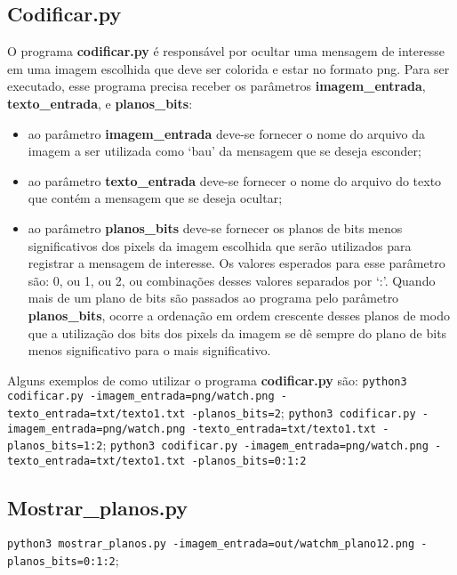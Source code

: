 \documentclass{article}
\begin{document}
\subsection{Codificar.py}
O programa \textbf{codificar.py} é responsável por ocultar uma mensagem de interesse em uma imagem escolhida que deve ser colorida e estar no formato png. Para ser executado, esse programa precisa receber os parâmetros \textbf{imagem\_entrada}, \textbf{texto\_entrada}, e \textbf{planos\_bits}:


\begin{itemize}
	\item ao parâmetro \textbf{imagem\_entrada} deve-se fornecer o nome do arquivo da imagem a ser utilizada como `bau' da mensagem que se deseja esconder;
	\item ao parâmetro \textbf{texto\_entrada} deve-se fornecer o nome do arquivo do texto que contém a mensagem que
	se deseja ocultar;
	\item ao parâmetro \textbf{planos\_bits} deve-se fornecer os planos de bits menos significativos dos pixels da imagem escolhida que serão utilizados para registrar a mensagem de interesse. Os valores esperados para esse parâmetro são: 0, ou 1, ou 2, ou combinações desses valores separados por ‘:’. Quando mais de um plano de bits são passados ao programa pelo parâmetro \textbf{planos\_bits}, ocorre a ordenação em ordem crescente desses planos de modo que a utilização dos bits dos pixels da imagem se dê sempre do plano de bits menos significativo para o mais significativo.
\end{itemize}

Alguns exemplos de como utilizar o programa \textbf{codificar.py} são: \lstinline{python3 codificar.py -imagem_entrada=png/watch.png -texto_entrada=txt/texto1.txt -planos_bits=2}; \lstinline{python3 codificar.py -imagem_entrada=png/watch.png -texto_entrada=txt/texto1.txt -planos_bits=1:2}; \lstinline{python3 codificar.py -imagem_entrada=png/watch.png -texto_entrada=txt/texto1.txt -planos_bits=0:1:2} 


\subsection{Mostrar\_planos.py}
\lstinline{python3 mostrar_planos.py -imagem_entrada=out/watchm_plano12.png -planos_bits=0:1:2};
\end{document}
